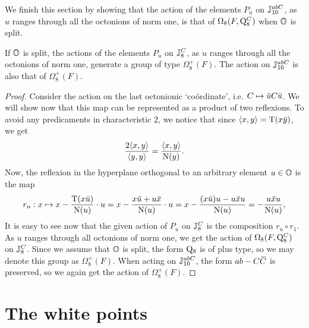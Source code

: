 We finish this section by showing that the action of the elements $P_u$ on $\mathbb{J}_{10}^{abC}$, 
as $u$ ranges
through all the octonions of norm one, is that of $\Omega_8(F,\mathord{\mathrm{Q}}_8^C)$ when $\mathbb{O}$ is split.

\begin{lemma}
	\label{lemma:1_spin8plus}
	If $\mathbb{O}$ is split, the actions of the elements $P_u$ on 
	$\mathbb{J}_8^C$, as $u$ ranges through	all the octonions of norm one, 
	generate a group of type 
	$\Omega_8^+(F)$. The action on $\mathbb{J}_{10}^{abC}$ is also that 
	of $\Omega_8^+(F)$.
\end{lemma}

\begin{proof}
Consider the action on the last octonionic `co\"{o}rdinate', i.e.
$C \mapsto \ovu   C \ovu  $. We will show now that this map can be represented as a
product of two reflexions. To avoid any predicaments in characteristic $2$, we notice that
since $\langle x,y \rangle = \operatorname{T}(x\mathord{\mbox{\hspace*{0pt}}\,\overline{\!y\!\!\;}\!\:}\mbox{\hspace*{0pt}} )$, we get
\begin{equation}
\frac{2 \langle x, y \rangle}{\langle y,y \rangle} =
\frac{\langle x, y \rangle}{\mathord{\mathrm{N}}(y)}.
\end{equation}
Now, the reflexion in the hyperplane orthogonal to an arbitrary element $u\in \mathbb{O}$ is the map
\begin{equation}
    r_u : x \mapsto     x - \frac{\Tr(x \ovu  )}{\NN(u)} \cdot u =
	 x - \frac{ x\ovu  + u\ovx  }{\NN(u)} \cdot u =
    x - \frac{(x\ovu  )u - u\ovx u}{\NN(u)} = - \frac{u\ovx u}{\NN(u)},
\end{equation}
It is easy to see now that the given
action of $P_u$ on $\mathbb{J}_8^C$ is the composition $r_u \circ r_1$. As $u$ ranges through all 
octonions of norm one, we get the action of $\Omega_8(F,\mathord{\mathrm{Q}}_8^C)$ on $\mathbb{J}_8^C$. Since we
assume that $\mathbb{O}$ is split, the form $\mathord{\mathrm{Q}}_8$ is of plus type, so we may denote this
group as $\Omega_8^+(F)$. When acting on $\mathbb{J}_{10}^{abC}$, the form $ab-C\mathord{\mbox{\hspace*{0pt}}\,\overline{\!C\!\!\;}\!\:}\mbox{\hspace*{0pt}}$ is
preserved, so we again get the action of $\Omega_8^+(F)$.
\end{proof}

\section{The white points}
